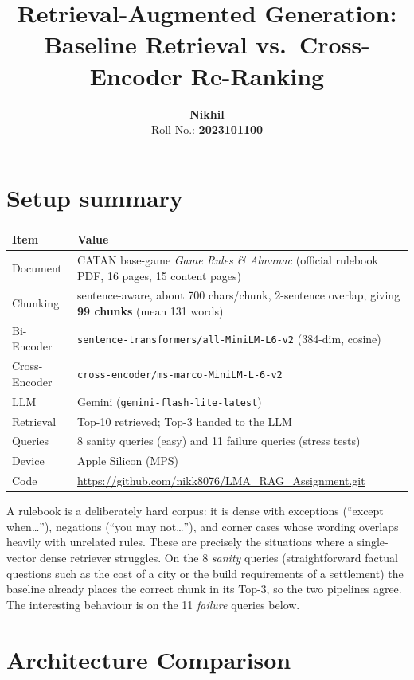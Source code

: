 \documentclass[11pt]{article}
\title{\textbf{Retrieval-Augmented Generation:\\[2pt]\large Baseline Retrieval vs.\ Cross-Encoder Re-Ranking}}
\author{\textbf{Nikhil} \\ Roll No.: \textbf{2023101100}}
\date{}
\newcommand{\code}[1]{\texttt{#1}}
\begin{document}
\maketitle
\vspace{-1.5em}

\section*{Setup summary}
\begin{center}
\begin{tabular}{@{}L{3.1cm} L{10.3cm}@{}}
\toprule
\textbf{Item} & \textbf{Value} \\
\midrule
Document & CATAN base-game \emph{Game Rules \& Almanac} (official rulebook PDF, 16 pages, 15 content pages) \\
Chunking & sentence-aware, about 700 chars/chunk, 2-sentence overlap, giving \textbf{99 chunks} (mean 131 words) \\
Bi-Encoder & \code{sentence-transformers/all-MiniLM-L6-v2} (384-dim, cosine) \\
Cross-Encoder & \code{cross-encoder/ms-marco-MiniLM-L-6-v2} \\
LLM & Gemini (\code{gemini-flash-lite-latest}) \\
Retrieval & Top-10 retrieved; Top-3 handed to the LLM \\
Queries & 8 sanity queries (easy) and 11 failure queries (stress tests) \\
Device & Apple Silicon (MPS) \\
Code & \url{https://github.com/nikk8076/LMA_RAG_Assignment.git} \\
\bottomrule
\end{tabular}
\end{center}

\noindent A rulebook is a deliberately hard corpus: it is dense with exceptions (``except
when\dots''), negations (``you may not\dots''), and corner cases whose wording overlaps heavily
with unrelated rules. These are precisely the situations where a single-vector dense retriever
struggles. On the 8 \emph{sanity} queries (straightforward factual questions such as the cost of a
city or the build requirements of a settlement) the baseline already places the correct chunk in
its Top-3, so the two pipelines agree. The interesting behaviour is on the 11 \emph{failure}
queries below.

\section{Architecture Comparison}
\end{document}
